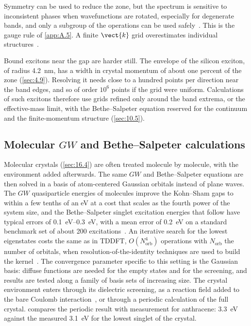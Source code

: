 Symmetry can be used to reduce the zone, but the spectrum is sensitive to inconsistent phases when wavefunctions are rotated, especially for degenerate bands, and only a subgroup of the operations can be used safely~\cite{albrecht1998ab}. This is the gauge rule of \cref{app:A.5}. A finite $\vect{k}$ grid overestimates individual structures~\cite{albrecht1998ab}.

Bound excitons near the gap are harder still. The envelope of the silicon exciton, of radius \SI{4.2}{nm}, has a width in crystal momentum of about one percent of the zone (\cref{sec:4.9}). Resolving it needs close to a hundred points per direction near the band edges, and so of order $10^6$ points if the grid were uniform. Calculations of such excitons therefore use grids refined only around the band extrema, or the effective-mass limit, with the Bethe--Salpeter equation reserved for the continuum and the finite-momentum structure (\cref{sec:10.5}).

\subsection{Molecular \texorpdfstring{$GW$}{GW} and Bethe--Salpeter calculations}

Molecular crystals (\cref{sec:16.4}) are often treated molecule by molecule, with the environment added afterwards. The same $GW$ and Bethe--Salpeter equations are then solved in a basis of atom-centered Gaussian orbitals instead of plane waves. The $GW$ quasiparticle energies of molecules improve the Kohn--Sham gaps to within a few tenths of an eV at a cost that scales as the fourth power of the system size, and the Bethe--Salpeter singlet excitation energies that follow have typical errors of \SIrange{0.1}{0.3}{eV}, with a mean error of \SI{0.2}{eV} on a standard benchmark set of about 200 excitations~\cite{blase2020bethe}. An iterative search for the lowest eigenstates costs the same as in TDDFT, $O(N_{\mathrm{orb}}^4)$ operations with $N_{\mathrm{orb}}$ the number of orbitals, when resolution-of-the-identity techniques are used to build the kernel~\cite{blase2020bethe}. The convergence parameter specific to this setting is the Gaussian basis: diffuse functions are needed for the empty states and for the screening, and results are tested along a family of basis sets of increasing size. The crystal environment enters through its dielectric screening, as a reaction field added to the bare Coulomb interaction~\cite{blase2020bethe}, or through a periodic calculation of the full crystal.  compares the periodic result with measurement for anthracene: \SI{3.3}{eV} against the measured \SI{3.1}{eV} for the lowest singlet of the crystal.

